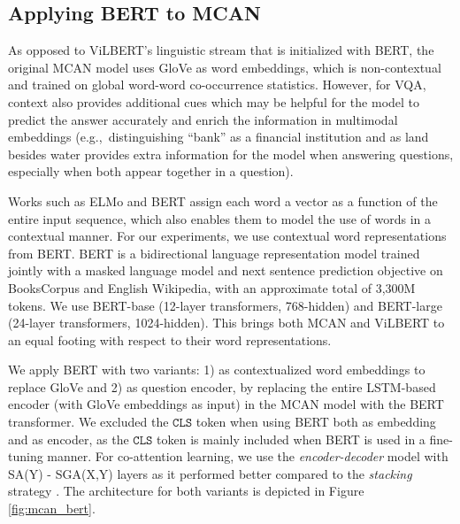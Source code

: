 \documentclass{article}
\begin{document}
\subsection{Applying BERT to MCAN}
As opposed to ViLBERT's linguistic stream that is initialized with BERT, the original MCAN model uses GloVe as word embeddings, which is non-contextual and trained on global word-word co-occurrence statistics. However, for VQA, context also provides additional cues which may be helpful for the model to predict the answer accurately and enrich the information in multimodal embeddings (e.g.,\ distinguishing ``bank'' as a financial institution and as land besides water provides extra information for the model when answering questions, especially when both appear together in a question). 

Works such as ELMo \citep{peters2018elmo} and BERT \citep{devlin-etal-2019-bert} assign each word a vector as a function of the entire input sequence, which also enables them to model the use of words in a contextual manner. For our experiments, we use contextual word representations from BERT. BERT is a bidirectional language representation model trained jointly with a masked language model and next sentence prediction objective on BooksCorpus \citep{bookscorpus} and English Wikipedia, with an approximate total of 3,300M tokens. We use BERT-base (12-layer transformers, 768-hidden) and BERT-large (24-layer transformers, 1024-hidden). This brings both MCAN and ViLBERT to an equal footing with respect to their word representations.

We apply BERT with two variants: 1) as contextualized word embeddings to replace GloVe and 2) as question encoder, by replacing the entire LSTM-based encoder (with GloVe embeddings as input) in the MCAN model with the BERT transformer. We excluded the $\mathtt{CLS}$ token when using BERT both as embedding and as encoder, as the $\mathtt{CLS}$ token is mainly included when BERT is used in a fine-tuning manner. For co-attention learning, we use the \textit{encoder-decoder} model with SA(Y) - SGA(X,Y) layers as it performed better compared to the \textit{stacking} strategy \citep{yu2019mcan}. The architecture for both variants is depicted in Figure \ref{fig:mcan_bert}.
\end{document}
